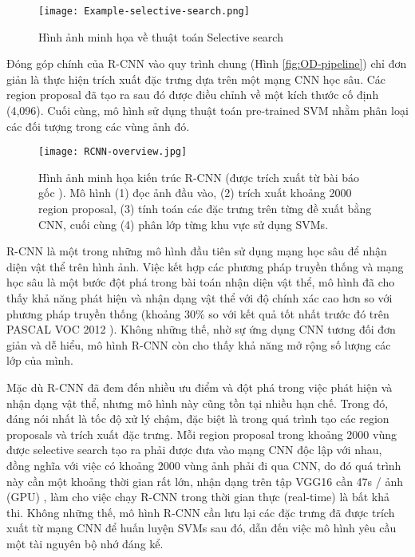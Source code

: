 \begin{figure}[h]
	\centering
	\texttt{[image: Example-selective-search.png]}
	\caption{Hình ảnh minh họa về thuật toán Selective search}
\end{figure}

Đóng góp chính của R-CNN vào quy trình chung (Hình \ref{fig:OD-pipeline}) chỉ đơn giản là thực hiện trích xuất đặc trưng dựa trên một mạng CNN học sâu. Các region proposal đã tạo ra sau đó được điều chỉnh về một kích thước cố định (4,096). Cuối cùng, mô hình sử dụng thuật toán pre-trained SVM nhằm phân loại các đối tượng trong các vùng ảnh đó.

\begin{figure}[h]
	\texttt{[image: RCNN-overview.jpg]}
	\caption{Hình ảnh minh họa kiến trúc R-CNN \textmd{(được trích xuất từ bài báo gốc \cite{girshick2014rich}). Mô hình (1) đọc ảnh đầu vào, (2) trích xuất khoảng 2000 region proposal, (3) tính toán các đặc trưng trên từng đề xuất bằng CNN, cuối cùng (4) phân lớp từng khu vực sử dụng SVMs. }}
\end{figure}

R-CNN là một trong những mô hình đầu tiên sử dụng mạng học sâu để nhận diện vật thể trên hình ảnh. Việc kết hợp các phương pháp truyền thống và mạng học sâu là một bước đột phá trong bài toán nhận diện vật thể, mô hình đã cho thấy khả năng phát hiện và nhận dạng vật thể với độ chính xác cao hơn so với phương pháp truyền thống (khoảng 30\% so với kết quả tốt nhất trước đó trên PASCAL VOC 2012 \citep{girshick2014rich}). Không những thế, nhờ sự ứng dụng CNN tương đối đơn giản và dễ hiểu, mô hình R-CNN còn cho thấy khả năng mở rộng số lượng các lớp của mình. 


Mặc dù R-CNN đã đem đến nhiều ưu điểm và đột phá trong việc phát hiện và nhận dạng vật thể, nhưng mô hình này cũng tồn tại nhiều hạn chế. Trong đó, đáng nói nhất là tốc độ xử lý chậm, đặc biệt là trong quá trình tạo các region proposals và trích xuất đặc trưng. Mỗi region proposal trong khoảng 2000 vùng được selective search tạo ra phải được đưa vào mạng CNN độc lập với nhau, đồng nghĩa với việc có khoảng 2000 vùng ảnh phải đi qua CNN, do đó quá trình này cần một khoảng thời gian rất lớn, nhận dạng trên tập VGG16 cần 47s / ảnh (GPU) \citep{girshick2014rich}, làm cho việc chạy R-CNN trong thời gian thực (real-time) là bất khả thi. Không những thế, mô hình R-CNN cần lưu lại các đặc trưng đã được trích xuất từ mạng CNN để huấn luyện SVMs sau đó, dẫn đến việc mô hình yêu cầu một tài nguyên bộ nhớ đáng kể. 


